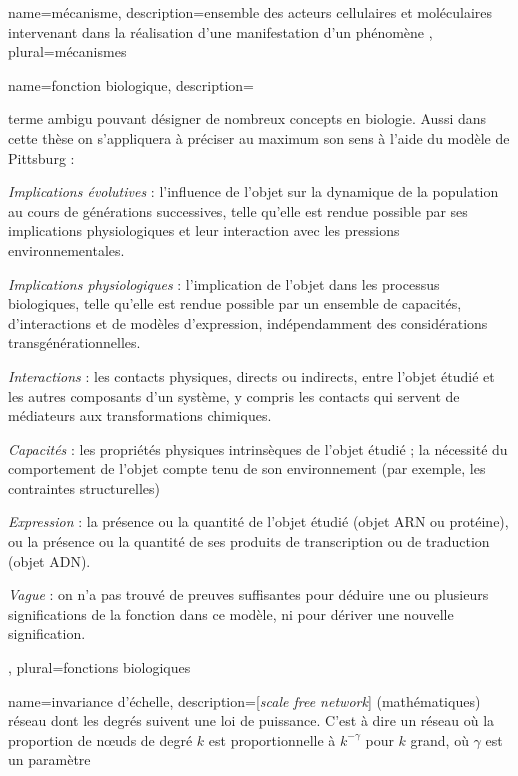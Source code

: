 {
	name={m\'{e}canisme},
	description={ensemble des acteurs cellulaires et moléculaires intervenant dans la réalisation d'une manifestation d'un phénomène \cite{Bechtel2013}}, 
	plural={m\'{e}canismes}
}

{
	name={fonction biologique},
	description={terme ambigu pouvant désigner de nombreux concepts en biologie. Aussi dans cette thèse on s'appliquera à préciser au maximum son sens à l'aide du modèle de Pittsburg \cite{Keeling2019Nov}:
	\begin{description}
	    \item \textit{Implications évolutives} : l'influence de l'objet sur la dynamique de la population au cours de générations successives, telle qu'elle est rendue possible par ses implications physiologiques et leur interaction avec les pressions environnementales.
	    \item \textit{Implications physiologiques} : l'implication de l'objet dans les processus biologiques, telle qu'elle est rendue possible par un ensemble de capacités, d'interactions et de modèles d'expression, indépendamment des considérations transgénérationnelles.
	    \item \textit{Interactions} : les contacts physiques, directs ou indirects, entre l'objet étudié et les autres composants d'un système, y compris les contacts qui servent de médiateurs aux transformations chimiques.
	    \item \textit{Capacités} : les propriétés physiques intrinsèques de l'objet étudié ; la nécessité du comportement de l'objet compte tenu de son environnement (par exemple, les contraintes structurelles)
	    \item \textit{Expression} : la présence ou la quantité de l'objet étudié (objet ARN ou protéine), ou la présence ou la quantité de ses produits de transcription ou de traduction (objet ADN).
	    \item \textit{Vague} : on n'a pas trouvé de preuves suffisantes pour déduire une ou plusieurs significations de la fonction dans ce modèle, ni pour dériver une nouvelle signification.
	\end{description}
	}, 
	plural={fonctions biologiques}
}

{
	name={invariance d'échelle},
	description={[\textit{scale free network}] (mathématiques) réseau dont les degrés suivent une loi de puissance. C'est à dire un réseau où la proportion de nœuds de degré $k$ est proportionnelle à $k^{-\gamma}$ pour $k$ grand, où $\gamma$ est un paramètre}
}


